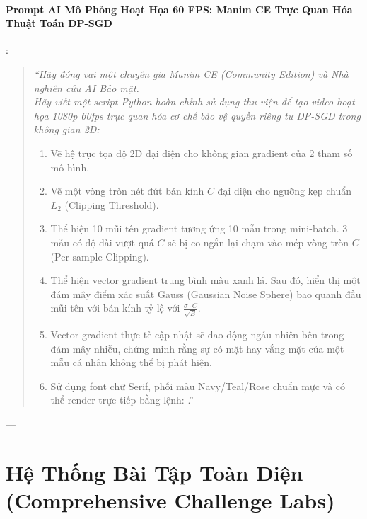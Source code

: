 \begin{simulationbox}
\paragraph{Prompt AI Mô Phỏng Hoạt Họa 60 FPS: Manim CE Trực Quan Hóa Thuật Toán DP-SGD}:
\begin{quote}
\small\itshape
``Hãy đóng vai một chuyên gia Manim CE (Community Edition) và Nhà nghiên cứu AI Bảo mật. \\
Hãy viết một script Python hoàn chỉnh sử dụng thư viện  để tạo video hoạt họa 1080p 60fps trực quan hóa cơ chế bảo vệ quyền riêng tư DP-SGD trong không gian 2D:
\begin{enumerate}
  \item Vẽ hệ trục tọa độ 2D đại diện cho không gian gradient của 2 tham số mô hình.
  \item Vẽ một vòng tròn nét đứt bán kính $C$ đại diện cho ngưỡng kẹp chuẩn $L_2$ (Clipping Threshold).
  \item Thể hiện 10 mũi tên gradient tương ứng 10 mẫu trong mini-batch. 3 mẫu có độ dài vượt quá $C$ sẽ bị co ngắn lại chạm vào mép vòng tròn $C$ (Per-sample Clipping).
  \item Thể hiện vector gradient trung bình màu xanh lá. Sau đó, hiển thị một đám mây điểm xác suất Gauss (Gaussian Noise Sphere) bao quanh đầu mũi tên với bán kính tỷ lệ với $\frac{\sigma \cdot C}{\sqrt{B}}$.
  \item Vector gradient thực tế cập nhật sẽ dao động ngẫu nhiên bên trong đám mây nhiễu, chứng minh rằng sự có mặt hay vắng mặt của một mẫu cá nhân không thể bị phát hiện.
  \item Sử dụng font chữ Serif, phối màu Navy/Teal/Rose chuẩn mực và có thể render trực tiếp bằng lệnh: .''
\end{enumerate}
\end{quote}
\end{simulationbox}

---

\section{Hệ Thống Bài Tập Toàn Diện (Comprehensive Challenge Labs)}
\label{sec:ch12-exercises}

